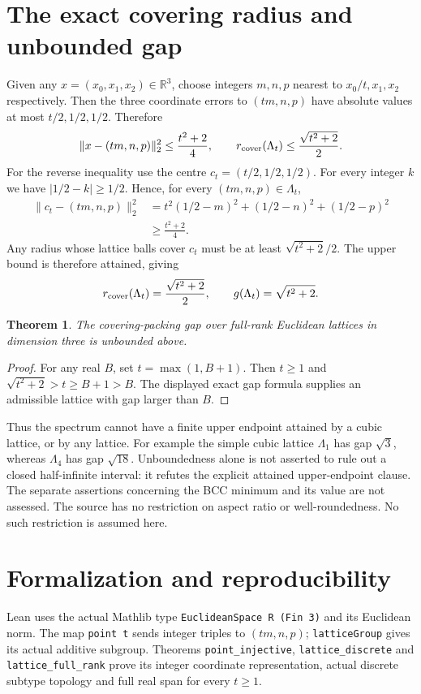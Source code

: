 \documentclass[11pt]{article}
\newtheorem{theorem}{Theorem}
\begin{document}
\section*{The exact covering radius and unbounded gap}
Given any $x=(x_0,x_1,x_2)\in\mathbb R^3$, choose
integers $m,n,p$ nearest to $x_0/t,x_1,x_2$ respectively.
Then the three coordinate errors to $(tm,n,p)$ have
absolute values at most $t/2,1/2,1/2$. Therefore
\[
 \|x-(tm,n,p)\|_2^2\leq\frac{t^2+2}{4},\qquad
 r_{\rm cover}(\Lambda_t)\leq\frac{\sqrt{t^2+2}}2.
\]
For the reverse inequality use the centre
$c_t=(t/2,1/2,1/2)$. For every integer $k$ we have
$|1/2-k|\geq1/2$. Hence, for every $(tm,n,p)\in\Lambda_t$,
\[
 \begin{split}
 \|c_t-(tm,n,p)\|_2^2
 &=t^2(1/2-m)^2+(1/2-n)^2+(1/2-p)^2\\
 &\geq\frac{t^2+2}{4}.
 \end{split}
\]
Any radius whose lattice balls cover $c_t$ must be at
least $\sqrt{t^2+2}/2$. The upper bound is therefore
attained, giving
\[
 r_{\rm cover}(\Lambda_t)=\frac{\sqrt{t^2+2}}2,
 \qquad g(\Lambda_t)=\sqrt{t^2+2}.
\]

\begin{theorem}
The covering-packing gap over full-rank Euclidean
lattices in dimension three is unbounded above.
\end{theorem}
\begin{proof}
For any real $B$, set $t=\max(1,B+1)$. Then $t\geq1$
and $\sqrt{t^2+2}>t\geq B+1>B$. The displayed exact
gap formula supplies an admissible lattice with gap
larger than $B$.
\end{proof}

Thus the spectrum cannot have a finite upper endpoint
attained by a cubic lattice, or by any lattice.
For example the simple cubic lattice $\Lambda_1$ has
gap $\sqrt3$, whereas $\Lambda_4$ has gap $\sqrt{18}$.
Unboundedness alone is not asserted to rule out a closed
half-infinite interval: it refutes the explicit attained
upper-endpoint clause. The separate assertions concerning
the BCC minimum and its value are not assessed.
The source has no restriction on aspect ratio or
well-roundedness. No such restriction is assumed here.

\newpage
\section*{Formalization and reproducibility}
Lean uses the actual Mathlib type
\texttt{EuclideanSpace R (Fin 3)} and its Euclidean norm.
The map \texttt{point t} sends integer triples to
$(tm,n,p)$; \texttt{latticeGroup} gives its actual additive
subgroup. Theorems \texttt{point\_injective},
\texttt{lattice\_discrete} and
\texttt{lattice\_full\_rank} prove its integer coordinate
representation, actual discrete subtype topology and
full real span for every $t\geq1$.
\end{document}
